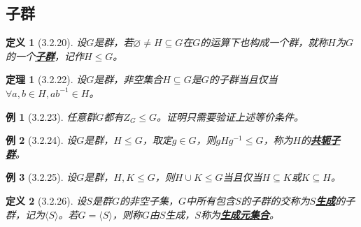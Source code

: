 \documentclass[landscape, a4paper]{article}
\theoremstyle{compact}
\newtheorem{theorem}{定理}
\newtheorem{example}{例}
\newtheorem{definition}{定义}
\def\obj#1{\textbf{\uline{#1}}}
\begin{document}
\begin{multicols}{3}
\subsection{子群}
\begin{definition}[3.2.20]
	设$G$是群，若$\varnothing \neq H \subseteq G$在$G$的运算下也构成一个群，就称$H$为$G$的一个\obj{子群}，记作$H \leqslant G$。
\end{definition}
\begin{theorem}[3.2.22]
	设$G$是群，非空集合$H \subseteq G$是$G$的子群当且仅当$\forall a, b \in H, ab^{-1} \in H$。
\end{theorem}
\begin{example}[3.2.23]
	任意群$G$都有$Z_G \leqslant G$。证明只需要验证上述等价条件。
\end{example}
\begin{example}[3.2.24]
	设$G$是群，$H \leqslant G$，取定$g \in G$，则$gHg^{-1} \leqslant G$，称为$H$的\obj{共轭子群}。
\end{example}
\begin{example}[3.2.25]
	设$G$是群，$H, K \leqslant G$，则$H \cup K \leqslant G$当且仅当$H \subseteq K$或$K \subseteq H$。
\end{example}
\begin{definition}[3.2.26]
	设$S$是群$G$的非空子集，$G$中所有包含$S$的子群的交称为$S$\obj{生成}的子群，记为$\langle S \rangle$。若$G = \langle S \rangle$，则称$G$由$S$生成，$S$称为\obj{生成元集合}。
\end{definition}

\end{multicols}
\end{document}
